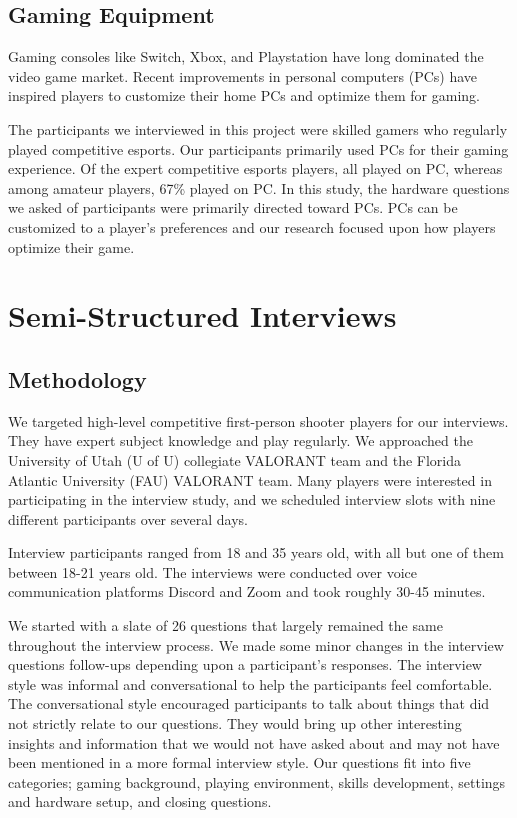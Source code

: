 \documentclass[11pt,manuscript,screen,review]{acmart} %
\begin{document}
\subsection{Gaming Equipment}
Gaming consoles like Switch, Xbox, and Playstation have long dominated the video game market. Recent improvements in personal computers (PCs) have inspired players to customize their home PCs and optimize them for gaming. \cite{hruska2020}

The participants we interviewed in this project were skilled gamers who regularly played competitive esports. Our participants primarily used PCs for their gaming experience. Of the expert competitive esports players, all played on PC, whereas among amateur players, 67\% played on PC. In this study, the hardware questions we asked of participants were primarily directed toward PCs. PCs can be customized to a player's preferences and our research focused upon how players optimize their game.

\section{Semi-Structured Interviews}

\subsection{Methodology}
We targeted high-level competitive first-person shooter players for our interviews. They have expert subject knowledge and play regularly. We approached the University of Utah (U of U) collegiate VALORANT team and the Florida Atlantic University (FAU) VALORANT team. Many players were interested in participating in the interview study, and we scheduled interview slots with nine different participants over several days. 

Interview participants ranged from 18 and 35 years old, with all but one of them between 18-21 years old. The interviews were conducted over voice communication platforms Discord \cite{discord} and Zoom \cite{zoom} and took roughly 30-45 minutes. 

We started with a slate of 26 questions that largely remained the same throughout the interview process. We made some minor changes in the interview questions follow-ups depending upon a participant’s responses. The interview style was informal and conversational to help the participants feel comfortable. The conversational style encouraged participants to talk about things that did not strictly relate to our questions. They would bring up other interesting insights and information that we would not have asked about and may not have been mentioned in a more formal interview style. Our questions fit into five categories; gaming background, playing environment, skills development, settings and hardware setup, and closing questions. 
\end{document}
